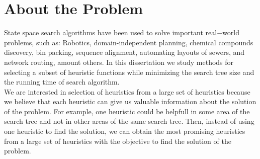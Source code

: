 

\chapter{About the Problem}\label{aboutTheProblem}

\iffalse
\chapterprecis{The purpose of this section if to motivate the problem.}\index{sinopse de capítulo}
\fi

State space search algorithms have been used to solve important real$-$world problems, such as: Robotics, domain-independent planning, chemical compounds discovery, bin packing, sequence alignment, automating layouts of sewers, and network routing, amount others. In this dissertation we study methods for selecting a subset of heuristic functions while minimizing the search tree size and the running time of search algorithm.\\

We are interested in selection of heuristics from a large set of heuristics because we believe that each heuristic can give us valuable information about the solution of the problem. For example, one heuristic could be helpfull in some area of the search tree and not in other areas of the same search tree. Then, instead of using one heuristic to find the solution, we can obtain the most promising heuristics from a large set of heuristics with the objective to find the solution of the problem.\\

